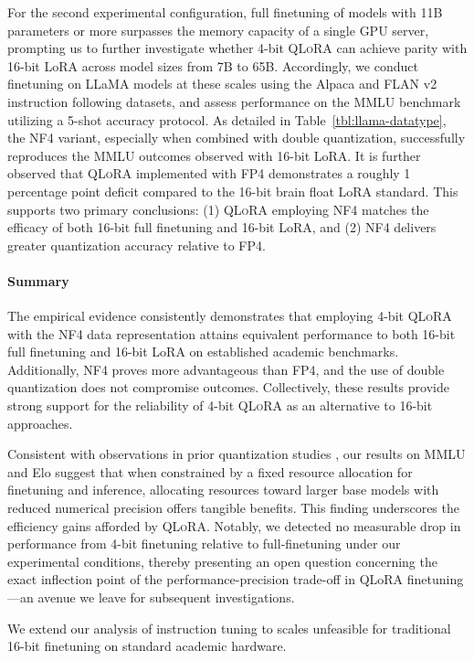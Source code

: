 For the second experimental configuration, full finetuning of models with 11B parameters or more surpasses the memory capacity of a single GPU server, prompting us to further investigate whether 4-bit \textsc{QLoRA} can achieve parity with 16-bit LoRA across model sizes from 7B to 65B. Accordingly, we conduct finetuning on LLaMA models at these scales using the Alpaca and FLAN v2 instruction following datasets, and assess performance on the MMLU benchmark utilizing a 5-shot accuracy protocol. As detailed in Table~\ref{tbl:llama-datatype}, the NF4 variant, especially when combined with double quantization, successfully reproduces the MMLU outcomes observed with 16-bit LoRA. It is further observed that \textsc{QLoRA} implemented with FP4 demonstrates a roughly 1 percentage point deficit compared to the 16-bit brain float LoRA standard. This supports two primary conclusions: (1) \textsc{QLoRA} employing NF4 matches the efficacy of both 16-bit full finetuning and 16-bit LoRA, and (2) NF4 delivers greater quantization accuracy relative to FP4.

\paragraph{Summary} The empirical evidence consistently demonstrates that employing 4-bit \textsc{QLoRA} with the NF4 data representation attains equivalent performance to both 16-bit full finetuning and 16-bit LoRA on established academic benchmarks. Additionally, NF4 proves more advantageous than FP4, and the use of double quantization does not compromise outcomes. Collectively, these results provide strong support for the reliability of 4-bit \textsc{QLoRA} as an alternative to 16-bit approaches.

Consistent with observations in prior quantization studies \citep{dettmers2022case}, our results on MMLU and Elo suggest that when constrained by a fixed resource allocation for finetuning and inference, allocating resources toward larger base models with reduced numerical precision offers tangible benefits. This finding underscores the efficiency gains afforded by \textsc{QLoRA}. Notably, we detected no measurable drop in performance from 4-bit finetuning relative to full-finetuning under our experimental conditions, thereby presenting an open question concerning the exact inflection point of the performance-precision trade-off in QLoRA finetuning—an avenue we leave for subsequent investigations.

We extend our analysis of instruction tuning to scales unfeasible for traditional 16-bit finetuning on standard academic hardware.

